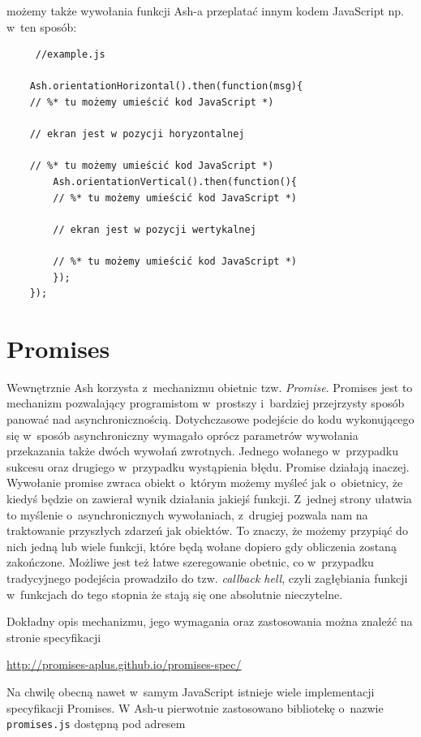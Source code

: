 \documentclass[brudnopis]{xmgr}
\begin{document}
możemy także wywołania funkcji Ash-a przeplatać innym kodem JavaScript np. w~ten sposób:

\begin{lstlisting}
     //example.js

    Ash.orientationHorizontal().then(function(msg){
	// %* tu możemy umieścić kod JavaScript *)
      	
	// ekran jest w pozycji horyzontalnej
      
	// %* tu możemy umieścić kod JavaScript *)
      	Ash.orientationVertical().then(function(){
		// %* tu możemy umieścić kod JavaScript *)

		// ekran jest w pozycji wertykalnej 

		// %* tu możemy umieścić kod JavaScript *)
      	});
    });
\end{lstlisting}

\section{Promises}

Wewnętrznie Ash korzysta z~mechanizmu obietnic tzw. \textit{Promise}. Promises jest to mechanizm pozwalający programistom w~prostszy i~bardziej przejrzysty sposób panować nad asynchronicznością. Dotychczasowe podejście do kodu wykonującego się w~sposób asynchroniczny wymagało oprócz parametrów wywołania przekazania także dwóch wywołań zwrotnych. Jednego wołanego w~przypadku sukcesu oraz drugiego w~przypadku wystąpienia błędu. Promise działają inaczej. Wywołanie promise zwraca obiekt o~którym możemy myśleć jak o~obietnicy, że kiedyś będzie on zawierał wynik działania jakiejś funkcji. Z~jednej strony ułatwia to myślenie o~asynchronicznych wywołaniach, z~drugiej pozwala nam na traktowanie przyszłych zdarzeń jak obiektów. To znaczy, że możemy przypiąć do nich jedną lub wiele funkcji, które będą wołane dopiero gdy obliczenia zostaną zakończone. Możliwe jest też łatwe szeregowanie obetnic, co w~przypadku tradycyjnego podejścia prowadziło do tzw. \textit{callback hell}, czyli zagłębiania funkcji w~funkcjach do tego stopnia że stają się one absolutnie nieczytelne. 

Dokładny opis mechanizmu, jego wymagania oraz zastosowania można znaleźć na  stronie specyfikacji

\url{http://promises-aplus.github.io/promises-spec/}

Na chwilę obecną nawet w~samym JavaScript istnieje wiele implementacji specyfikacji Promises. W Ash-u pierwotnie zastosowano bibliotekę o~nazwie \texttt{promises.js} dostępną pod adresem
\end{document}
